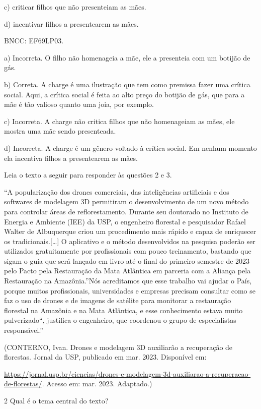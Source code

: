 c) criticar filhos que não presenteiam as mães.

d) incentivar filhos a presentearem as mães.

BNCC: EF69LP03.

a) Incorreta. O filho não homenageia a mãe, ele a presenteia com um
botijão de gás.

b) Correta. A charge é uma ilustração que tem como premissa fazer uma
crítica social. Aqui, a crítica social é feita ao alto preço do botijão
de gás, que para a mãe é tão valioso quanto uma joia, por exemplo.

c) Incorreta. A charge não critica filhos que não homenageiam as mães,
ele mostra uma mãe sendo presenteada.

d) Incorreta. A charge é um gênero voltado à crítica social. Em nenhum
momento ela incentiva filhos a presentearem as mães.

Leia o texto a seguir para responder às questões 2 e 3.

``A popularização dos drones comerciais, das inteligências artificiais e
dos softwares de modelagem 3D permitiram o desenvolvimento de um novo
método para controlar áreas de reflorestamento. Durante seu doutorado no
Instituto de Energia e Ambiente (IEE) da USP, o engenheiro florestal e
pesquisador Rafael Walter de Albuquerque criou um procedimento mais
rápido e capaz de enriquecer os tradicionais.{[}\ldots{}{]} O aplicativo e o
método desenvolvidos na pesquisa poderão ser utilizados gratuitamente
por profissionais com pouco treinamento, bastando que sigam o guia que
será lançado em livro até o final do primeiro semestre de 2023 pelo
Pacto pela Restauração da Mata Atlântica em parceria com a Aliança pela
Restauração na Amazônia.''Nós acreditamos que esse trabalho vai ajudar o
País, porque muitos profissionais, universidades e empresas precisam
consultar como se faz o uso de drones e de imagens de satélite para
monitorar a restauração florestal na Amazônia e na Mata Atlântica, e
esse conhecimento estava muito pulverizado``, justifica o engenheiro,
que coordenou o grupo de especialistas responsável.''

(CONTERNO, Ivan. Drones e modelagem 3D auxiliarão a recuperação de
florestas. Jornal da USP, publicado em mar. 2023. Disponível em:

\url{https://jornal.usp.br/ciencias/drones-e-modelagem-3d-auxiliarao-a-recuperacao-de-florestas/}.
Acesso em: mar. 2023. Adaptado.)

\num{2} Qual é o tema central do texto?

